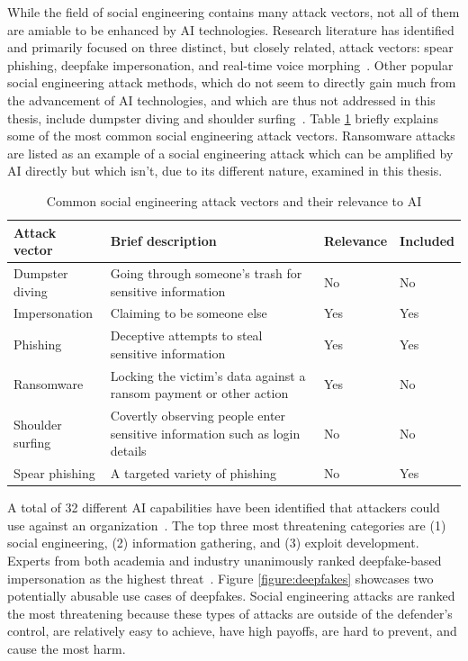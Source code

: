 %
%
While the field of social engineering contains many attack vectors, not all of them are amiable to be enhanced by AI technologies. Research literature has identified and primarily focused on three distinct, but closely related, attack vectors: spear phishing, deepfake impersonation, and real-time voice morphing~\citep{king_AI_Crime_Interdisciplinary_Analysis_2019}. Other popular social engineering attack methods, which do not seem to directly gain much from the advancement of AI technologies, and which are thus not addressed in this thesis, include dumpster diving and shoulder surfing~\citep{mirsky_Threat_Offensive_AI_Organizations_2023}. Table \ref{table:attacks} briefly explains some of the most common social engineering attack vectors. Ransomware attacks are listed as an example of a social engineering attack which can be amplified by AI directly but which isn’t, due to its different nature, examined in this thesis.

\begin{table}[ht!]  
\centering  
\renewcommand{\arraystretch}{1.5} %
\setlength{\tabcolsep}{5pt} %
\begin{tabularx}{\textwidth}{|l|X|l|l|} %
\hline  
\textbf{Attack vector} & \textbf{Brief description} & \textbf{Relevance} & \textbf{Included} \\ \hline  
Dumpster diving & Going through someone's trash for sensitive information & No & No \\ \hline  
Impersonation & Claiming to be someone else & Yes & Yes \\ \hline  
Phishing & Deceptive attempts to steal sensitive information & Yes & Yes \\ \hline  
Ransomware & Locking the victim's data against a ransom payment or other action & Yes & No \\ \hline  
Shoulder surfing & Covertly observing people enter sensitive information such as login details & No & No \\ \hline  
Spear phishing & A targeted variety of phishing & No & Yes \\ \hline  
\end{tabularx}  
\caption{Common social engineering attack vectors and their relevance to AI}  
\label{table:attacks}  
\end{table} 


%
%
A total of 32 different AI capabilities have been identified that attackers could use against an organization~\citep{mirsky_Threat_Offensive_AI_Organizations_2023}. The top three most threatening categories are (1) social engineering, (2) information gathering, and (3) exploit development. Experts from both academia and industry unanimously ranked deepfake-based impersonation as the highest threat~\citep{mirsky_Threat_Offensive_AI_Organizations_2023}. Figure \ref{figure:deepfakes} showcases two potentially abusable use cases of deepfakes. Social engineering attacks are ranked the most threatening because these types of attacks are outside of the defender's control, are relatively easy to achieve, have high payoffs, are hard to prevent, and cause the most harm.

